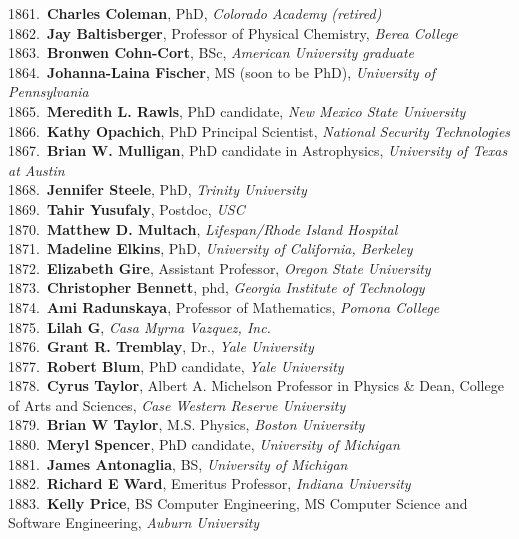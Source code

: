 1861.~{\bf Charles Coleman}, PhD, {\sl Colorado Academy (retired)} \\
1862.~{\bf Jay Baltisberger}, Professor of Physical Chemistry, {\sl Berea College} \\
1863.~{\bf Bronwen Cohn-Cort}, BSc, {\sl American University graduate} \\
1864.~{\bf Johanna-Laina Fischer}, MS (soon to be PhD), {\sl University of Pennsylvania} \\
1865.~{\bf Meredith L. Rawls}, PhD candidate, {\sl New Mexico State University } \\
1866.~{\bf Kathy Opachich}, PhD Principal Scientist, {\sl National Security Technologies } \\
1867.~{\bf Brian W. Mulligan}, PhD candidate in Astrophysics, {\sl University of Texas at Austin} \\
1868.~{\bf Jennifer Steele}, PhD, {\sl Trinity University } \\
1869.~{\bf Tahir Yusufaly}, Postdoc, {\sl USC} \\
1870.~{\bf Matthew D. Multach}, {\sl Lifespan/Rhode Island Hospital} \\
1871.~{\bf Madeline Elkins}, PhD, {\sl University of California, Berkeley } \\
1872.~{\bf Elizabeth Gire}, Assistant Professor, {\sl Oregon State University} \\
1873.~{\bf Christopher Bennett}, phd, {\sl Georgia Institute of Technology} \\
1874.~{\bf Ami Radunskaya}, Professor of Mathematics, {\sl Pomona College} \\
1875.~{\bf Lilah G}, {\sl Casa Myrna Vazquez, Inc.} \\
1876.~{\bf Grant R. Tremblay}, Dr., {\sl Yale University} \\
1877.~{\bf Robert Blum}, PhD candidate, {\sl Yale University} \\
1878.~{\bf Cyrus Taylor}, Albert A. Michelson Professor in Physics \& Dean, College of Arts and Sciences, {\sl Case Western Reserve University} \\
1879.~{\bf Brian W Taylor}, M.S. Physics, {\sl Boston University} \\
1880.~{\bf Meryl Spencer}, PhD candidate, {\sl University of Michigan} \\
1881.~{\bf James Antonaglia}, BS, {\sl University of Michigan} \\
1882.~{\bf Richard E Ward}, Emeritus Professor, {\sl Indiana University} \\
1883.~{\bf Kelly Price}, BS Computer Engineering, MS Computer Science and Software Engineering, {\sl Auburn University} \\

